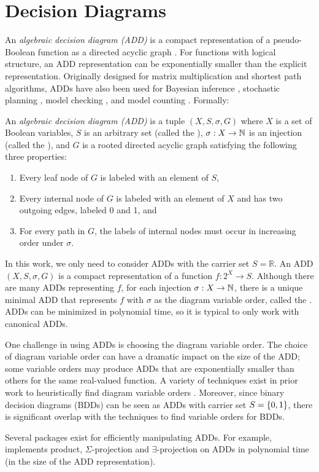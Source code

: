 \section{Decision Diagrams}
\label{sec:background:dd}
An \emph{algebraic decision diagram (ADD)} is a compact representation of a pseudo-Boolean function as a directed acyclic graph \cite{bahar1997algebraic}.
For functions with logical structure, an ADD representation can be exponentially smaller than the explicit representation.
Originally designed for matrix multiplication and shortest path algorithms, ADDs have also been used for Bayesian inference \cite{chavira2007compiling,gogate2011approximation}, stochastic planning \cite{hoey1999spudd}, model checking \cite{kwiatkowska2007stochastic}, and model counting \cite{fargier2014knowledge,DPV20}. Formally:

\begin{definition}[ADD]
\label{def:add}
An \emph{algebraic decision diagram (ADD)} is a tuple $(X, S, \sigma, G)$ where $X$ is a set of Boolean variables, $S$ is an arbitrary set (called the ), $\sigma: X \to \mathbb{N}$ is an injection (called the ), and $G$ is a rooted directed acyclic graph satisfying the following three properties:
\begin{enumerate}
    \item Every leaf node of $G$ is labeled with an element of $S$,
    \item Every internal node of $G$ is labeled with an element of $X$ and has two outgoing edges, labeled 0 and 1, and
    \item For every path in $G$, the labels of internal nodes must occur in increasing order under $\sigma$.
\end{enumerate}
\end{definition}
In this work, we only need to consider ADDs with the carrier set $S = \mathbb{R}$. 
An ADD $(X, S, \sigma, G)$ is a compact representation of a function $f: 2^X \to S$.
Although there are many ADDs representing $f$, for each injection $\sigma: X \to \mathbb{N}$, there is a unique minimal ADD that represents $f$ with $\sigma$ as the diagram variable order, called the .
ADDs can be minimized in polynomial time, so it is typical to only work with canonical ADDs.

One challenge in using ADDs is choosing the diagram variable order.
The choice of diagram variable order can have a dramatic impact on the size of the ADD; some variable orders may produce ADDs that are exponentially smaller than others for the same real-valued function.
A variety of techniques exist in prior work to heuristically find diagram variable orders \cite{tarjan1984simple,koster2001treewidth,dechter03}.
Moreover, since binary decision diagrams (BDDs) \cite{bryant1986graph} can be seen as ADDs with carrier set $S = \left\{ 0, 1 \right\}$, there is significant overlap with the techniques to find variable orders for BDDs.

Several packages exist for efficiently manipulating ADDs.
For example, \cudd{} \cite{somenzi2015cudd} implements product, $\Sigma$-projection and $\exists$-projection on ADDs in polynomial time (in the size of the ADD representation).